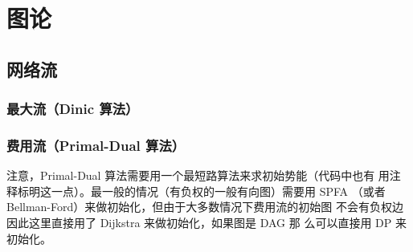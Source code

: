 \chapter{图论}
\section{网络流}
\subsection{最大流（Dinic 算法）}

\subsection{费用流（Primal-Dual 算法）}
注意，Primal-Dual 算法需要用一个最短路算法来求初始势能（代码中也有
用注释标明这一点）。最一般的情况（有负权的一般有向图）需要用 SPFA
（或者 Bellman-Ford）来做初始化，但由于大多数情况下费用流的初始图
不会有负权边因此这里直接用了 Dijkstra 来做初始化，如果图是 DAG 那
么可以直接用 DP 来初始化。
